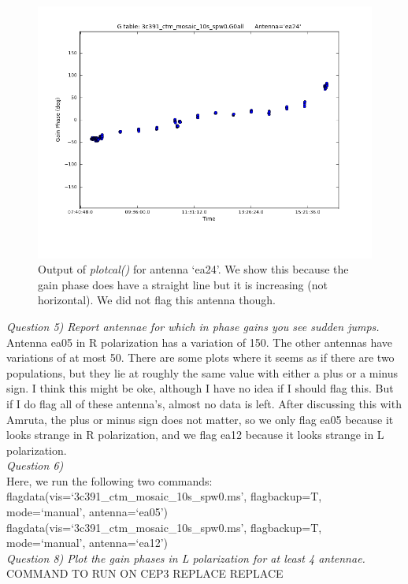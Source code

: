 \documentclass[12pt, a4paper]{article}
\begin{document}
\begin{figure}[h!]
    \centering
    \includegraphics[scale=0.5]{../Imaging/plots/phase_calibration_part4c_question5_ea24.png}
    \caption{Output of \emph{plotcal()} for antenna `ea24'. We show this because the gain phase does have a straight line but it is increasing (not horizontal). We did not flag this antenna though. \label{fig:part4subC2-4}}
\end{figure}
\newpage


\noindent \textit{Question 5) Report antennae for which in phase gains you see sudden jumps.} \\
Antenna ea05 in R polarization has a variation of 150. The other antennas have variations of at most 50. There are some plots where it seems as if there are two populations, but they lie at roughly the same value with either a plus or a minus sign. I think this might be oke, although I have no idea if I should flag this. But if I do flag all of these antenna's, almost no data is left. After discussing this with Amruta, the plus or minus sign does not matter, so we only flag ea05 because it looks strange in R polarization, and we flag ea12 because it looks strange in L polarization. \\

\noindent \textit{Question 6) } \\
\noindent Here, we run the following two commands: \\
{\tiny flagdata(vis=`3c391\_ctm\_mosaic\_10s\_spw0.ms', flagbackup=T, mode=`manual', antenna=`ea05') \\
\noindent flagdata(vis=`3c391\_ctm\_mosaic\_10s\_spw0.ms', flagbackup=T, mode=`manual', antenna=`ea12') \\ }
% 
\noindent \textit{Question 8) Plot the gain phases in L polarization for at least 4 antennae.} \\
COMMAND TO RUN ON CEP3 REPLACE REPLACE
\end{document}
